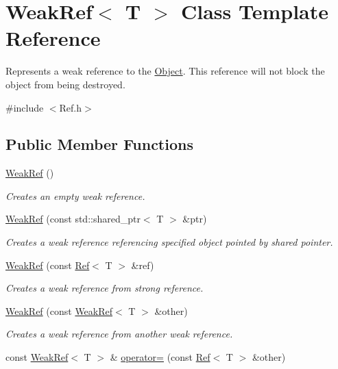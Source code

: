 \hypertarget{class_weak_ref}{}\section{Weak\+Ref$<$ T $>$ Class Template Reference}
\label{class_weak_ref}


Represents a weak reference to the \mbox{\hyperlink{class_object}{Object}}. This reference will not block the object from being destroyed.  




{\ttfamily \#include $<$Ref.\+h$>$}

\subsection*{Public Member Functions}
\begin{DoxyCompactItemize}
\item 
\mbox{\hyperlink{class_weak_ref_a911e3a2e31e3d06d035ddbf974d90522}{Weak\+Ref}} ()
\begin{DoxyCompactList}\small\item\em Creates an empty weak reference. \end{DoxyCompactList}\item 
\mbox{\hyperlink{class_weak_ref_a65c8f8562c7d454e5fbc3e6d146d7a83}{Weak\+Ref}} (const std\+::shared\+\_\+ptr$<$ T $>$ \&ptr)
\begin{DoxyCompactList}\small\item\em Creates a weak reference referencing specified object pointed by shared pointer. \end{DoxyCompactList}\item 
\mbox{\hyperlink{class_weak_ref_ab62598b1291c2f856ebc1634a4495232}{Weak\+Ref}} (const \mbox{\hyperlink{class_ref}{Ref}}$<$ T $>$ \&ref)
\begin{DoxyCompactList}\small\item\em Creates a weak reference from strong reference. \end{DoxyCompactList}\item 
\mbox{\hyperlink{class_weak_ref_a85ba02cd6bba30a98734a837dd900b2a}{Weak\+Ref}} (const \mbox{\hyperlink{class_weak_ref}{Weak\+Ref}}$<$ T $>$ \&other)
\begin{DoxyCompactList}\small\item\em Creates a weak reference from another weak reference. \end{DoxyCompactList}\item 
const \mbox{\hyperlink{class_weak_ref}{Weak\+Ref}}$<$ T $>$ \& \mbox{\hyperlink{class_weak_ref_a1ea1d08432dd8646f6c085fc93477e75}{operator=}} (const \mbox{\hyperlink{class_ref}{Ref}}$<$ T $>$ \&other)

\end{DoxyCompactItemize}
